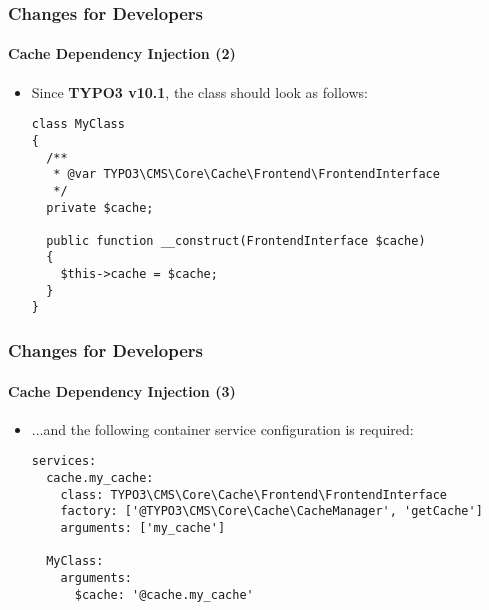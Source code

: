 
\begin{frame}[fragile]
	\frametitle{Changes for Developers}
	\framesubtitle{Cache Dependency Injection (2)}

	\lstset{basicstyle=\tiny\ttfamily}

	\begin{itemize}
		\item Since \textbf{TYPO3 v10.1}, the class should look as follows:

\begin{lstlisting}
class MyClass
{
  /**
   * @var TYPO3\CMS\Core\Cache\Frontend\FrontendInterface
   */
  private $cache;

  public function __construct(FrontendInterface $cache)
  {
    $this->cache = $cache;
  }
}
\end{lstlisting}

	\end{itemize}

\end{frame}


\begin{frame}[fragile]
	\frametitle{Changes for Developers}
	\framesubtitle{Cache Dependency Injection (3)}

	\lstset{basicstyle=\tiny\ttfamily}

	\begin{itemize}
		\item ...and the following container service configuration is required:

\begin{lstlisting}
services:
  cache.my_cache:
    class: TYPO3\CMS\Core\Cache\Frontend\FrontendInterface
    factory: ['@TYPO3\CMS\Core\Cache\CacheManager', 'getCache']
    arguments: ['my_cache']

  MyClass:
    arguments:
      $cache: '@cache.my_cache'
\end{lstlisting}

	\end{itemize}

\end{frame}

